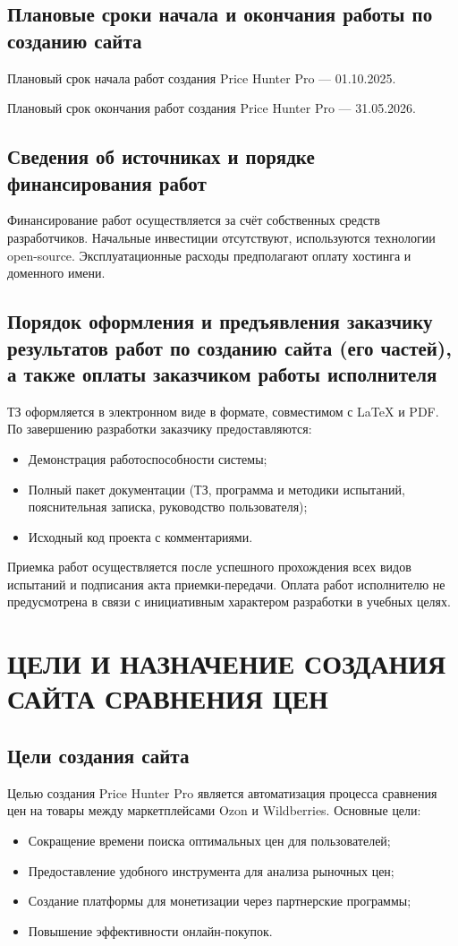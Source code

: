 \documentclass[a4paper,12pt]{article}
\begin{document}
\subsection{Плановые сроки начала и окончания работы по созданию сайта}
Плановый срок начала работ создания Price Hunter Pro — 01.10.2025. 

Плановый срок окончания работ создания Price Hunter Pro — 31.05.2026.

\subsection{Сведения об источниках и порядке финансирования работ}
Финансирование работ осуществляется за счёт собственных средств разработчиков. Начальные инвестиции отсутствуют, используются технологии open-source. Эксплуатационные расходы предполагают оплату хостинга и доменного имени.

\subsection{Порядок оформления и предъявления заказчику результатов работ по созданию сайта (его частей), а также оплаты заказчиком работы исполнителя}
ТЗ оформляется в электронном виде в формате, совместимом с LaTeX и PDF. По завершению разработки заказчику предоставляются:
\begin{itemize}
    \item Демонстрация работоспособности системы;
    \item Полный пакет документации (ТЗ, программа и методики испытаний, пояснительная записка, руководство пользователя);
    \item Исходный код проекта с комментариями.
\end{itemize}
Приемка работ осуществляется после успешного прохождения всех видов испытаний и подписания акта приемки-передачи. Оплата работ исполнителю не предусмотрена в связи с инициативным характером разработки в учебных целях.

\newpage
\section{ЦЕЛИ И НАЗНАЧЕНИЕ СОЗДАНИЯ САЙТА СРАВНЕНИЯ ЦЕН}

\subsection{Цели создания сайта}
Целью создания Price Hunter Pro является автоматизация процесса сравнения цен на товары между маркетплейсами Ozon и Wildberries. Основные цели:
\begin{itemize}
    \item Сокращение времени поиска оптимальных цен для пользователей;
    \item Предоставление удобного инструмента для анализа рыночных цен;
    \item Создание платформы для монетизации через партнерские программы;
    \item Повышение эффективности онлайн-покупок.
\end{itemize}
\end{document}
